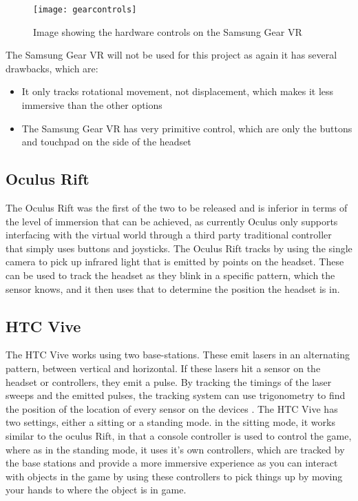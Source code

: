 \begin{figure}[H]
	\texttt{[image: gearcontrols]}
	\centering
	\caption{Image showing the hardware controls on the Samsung Gear VR \cite{gearbuttons}}
	\label{fig:gearcontrols}
\end{figure}

The Samsung Gear VR will not be used for this project as again it has several drawbacks, which are:

\begin{itemize}
	\item It only tracks rotational movement, not displacement, which makes it less immersive than the other options
	\item The Samsung Gear VR has very primitive control, which are only the buttons and touchpad on the side of the headset
\end{itemize}		


\subsection{Oculus Rift}
The Oculus Rift was the first of the two to be released and is inferior in terms of the level of immersion that can be achieved, as currently Oculus only supports interfacing with the virtual world through a third party traditional controller that simply uses buttons and joysticks. The Oculus Rift tracks by using the single camera to pick up infrared light that is emitted by points on the headset. These can be used to track the headset as they blink in a specific pattern, which the sensor knows, and it then uses that to determine the position the headset is in.

\subsection{HTC Vive}
The HTC Vive works using two base-stations. These emit lasers in an alternating pattern, between vertical and horizontal. If these lasers hit a sensor on the headset or controllers, they emit a pulse. By tracking the timings of the laser sweeps and the emitted pulses, the tracking system can use trigonometry to find the position of the location of every sensor on the devices \cite{vivetechnology}. The HTC Vive has two settings, either a sitting or a standing mode. in the sitting mode, it works similar to the oculus Rift, in that a console controller is used to control the game, where as in the standing mode, it uses it's own controllers, which are tracked by the base stations and provide a more immersive experience as you can interact with objects in the game by using these controllers to pick things up by moving your hands to where the object is in game.

